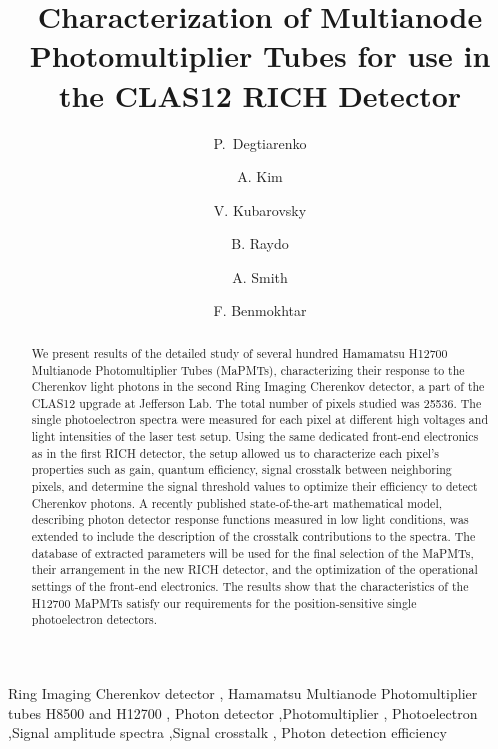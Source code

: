 \documentclass[preprint]{elsarticle}
\begin{document}
\begin{frontmatter}
\title{Characterization of Multianode Photomultiplier Tubes for use in the CLAS12 RICH Detector}

\author[A]{P.~Degtiarenko }
\author[B]{A. Kim } 
\author[A]{V. Kubarovsky }
\author[A]{B. Raydo}
\author[C]{A. Smith}
\author[D]{F. Benmokhtar}



\address[A]{Thomas Jefferson National Accelerator Facility, Newport News, VA 23606, USA}
\address[B]{University of Connecticut, Storrs, CT 06269, USA}
\address[C]{Duke University, Durham, NC 27705, USA}
\address[D]{Duquesne University, Pittsburgh, PA, 15282, USA}



\begin{abstract}
We present results of the detailed study of several hundred Hamamatsu H12700 Multianode Photomultiplier Tubes (MaPMTs), characterizing their response to the Cherenkov light photons in the second Ring Imaging Cherenkov detector, a part of the CLAS12 upgrade at Jefferson Lab.
The total number of pixels studied was 25536.
The single photoelectron spectra were measured for each pixel at different high voltages and  light intensities of the laser test setup. Using the same dedicated front-end electronics as in the first RICH detector, the setup allowed us to characterize each pixel's properties such as gain, quantum efficiency, signal crosstalk between neighboring pixels,
and determine the signal threshold values to optimize their efficiency to detect Cherenkov photons.
A recently published state-of-the-art mathematical model, describing photon detector response functions measured in low light conditions, was extended to include the description of the crosstalk contributions to the spectra.
The database of extracted parameters will be used for the final selection of the MaPMTs, their arrangement in the new RICH detector, and the optimization of the operational settings of the front-end electronics.
The results show that the characteristics of the H12700 MaPMTs satisfy our requirements for the position-sensitive single photoelectron detectors.
\end{abstract}

\begin{keyword}
Ring Imaging Cherenkov detector \sep
Hamamatsu Multianode Photomultiplier tubes H8500 and H12700 \sep
Photon detector \sep Photomultiplier \sep
Photoelectron \sep  Signal amplitude spectra \sep Signal crosstalk \sep
Photon detection efficiency
\end{keyword}


\end{frontmatter}
\end{document}
